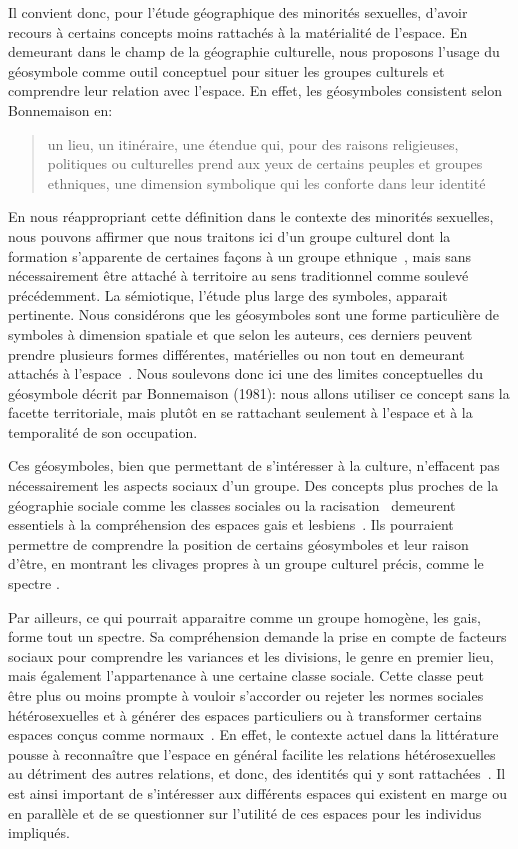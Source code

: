 Il convient donc, pour l'étude géographique des minorités sexuelles, d'avoir recours à certains concepts moins rattachés à la matérialité de l'espace. 
En demeurant dans le champ de la géographie culturelle, nous proposons l'usage du géosymbole comme outil conceptuel pour situer les groupes culturels et comprendre leur relation avec l'espace. 
En effet, les géosymboles consistent selon Bonnemaison en: \blockquote[{\cite[256]{Bonnemaison1981}}][.]{\textelp{} un lieu, un  itinéraire, une étendue qui, pour des raisons religieuses, politiques ou   culturelles prend aux yeux de certains peuples et groupes ethniques, une   dimension symbolique qui les conforte dans leur identité }. 
En nous réappropriant cette définition dans le contexte des minorités sexuelles, nous pouvons affirmer que nous traitons ici d'un groupe culturel dont la formation s'apparente de certaines façons à un groupe ethnique~\citep{Sinfield1996}, mais sans nécessairement être attaché à territoire au sens traditionnel comme soulevé précédemment. 
La sémiotique, l'étude plus large des symboles, apparait pertinente. 
Nous considérons que les géosymboles sont une forme particulière de symboles à dimension spatiale et que selon les auteurs, ces derniers peuvent prendre plusieurs formes différentes, matérielles ou non tout en demeurant attachés à l'espace~\citep{Bonnemaison1981,Bedard2002}. 
Nous soulevons donc ici une des limites conceptuelles du géosymbole décrit par Bonnemaison (1981): nous allons utiliser ce concept sans la facette territoriale, mais plutôt en se rattachant seulement à l'espace et à la temporalité de son occupation.

Ces géosymboles, bien que permettant de s'intéresser à la culture, n'effacent pas nécessairement les aspects sociaux d'un groupe. 
Des concepts plus proches de la géographie sociale comme les classes sociales ou la racisation~\citep{Bonniol2005} demeurent essentiels à la compréhension des espaces gais et lesbiens~\citep[93]{Oswin2008}. 
Ils pourraient permettre de comprendre la position de certains géosymboles et leur raison d'être, en montrant les clivages propres à un groupe culturel précis, comme le spectre \lgbt{}.

Par ailleurs, ce qui pourrait apparaitre comme un groupe homogène, les gais, forme tout un spectre. 
Sa compréhension demande la prise en compte de facteurs sociaux pour comprendre les variances et les divisions, le genre en premier lieu, mais également l'appartenance à une certaine classe sociale.
Cette classe peut être plus ou moins prompte à vouloir s'accorder ou rejeter les normes sociales hétérosexuelles et à générer des espaces particuliers ou à transformer certains espaces conçus comme normaux~\citep{Lewis2011}. 
En effet, le contexte actuel dans la littérature pousse à reconnaître que l'espace en général facilite les relations hétérosexuelles au détriment des autres relations, et donc, des identités qui y sont rattachées~\citep{Brown2003}. 
Il est ainsi important de s'intéresser aux différents espaces qui existent en marge ou en parallèle et de se questionner sur l'utilité de ces espaces pour les individus impliqués.

